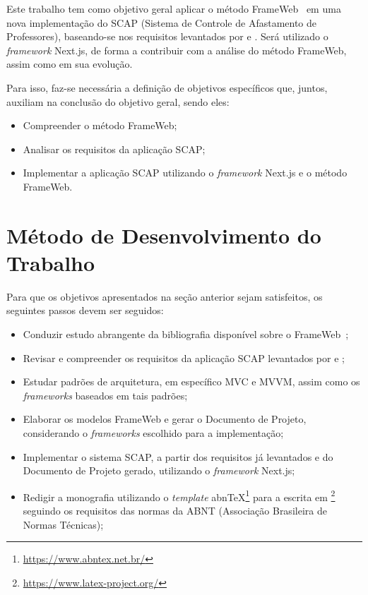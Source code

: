Este trabalho tem como objetivo geral aplicar o método FrameWeb~\cite{souza:2007} em uma nova implementação do SCAP (Sistema de Controle de Afastamento de Professores),
baseando-se nos requisitos levantados por \cite{duarte:2014} e \cite{prado:2015}. Será utilizado o \textit{framework} Next.js, de forma a contribuir com a análise do método FrameWeb, assim como em sua evolução.

Para isso, faz-se necessária a definição de objetivos específicos que, juntos, auxiliam na conclusão do objetivo geral, sendo eles:
\begin{itemize}
    \item Compreender o método FrameWeb;
    \item Analisar os requisitos da aplicação SCAP;
    \item Implementar a aplicação SCAP utilizando o \textit{framework} Next.js e o método FrameWeb.
\end{itemize}


\section{Método de Desenvolvimento do Trabalho}
\label{sec-intro-met}

Para que os objetivos apresentados na seção anterior sejam satisfeitos, os seguintes passos devem ser seguidos:

\begin{itemize}
    \item Conduzir estudo abrangente da bibliografia disponível sobre o FrameWeb~\cite{souza:2007,souza:2020};
    \item Revisar e compreender os requisitos da aplicação SCAP levantados por \cite{duarte:2014} e \cite{prado:2015};
    \item Estudar padrões de arquitetura, em específico MVC e MVVM, assim como os \textit{frameworks} baseados em tais padrões;
    \item Elaborar os modelos FrameWeb e gerar o Documento de Projeto, considerando o \textit{frameworks} escolhido para a implementação;
    \item Implementar o sistema SCAP, a partir dos requisitos já levantados e do Documento de Projeto gerado, utilizando o \textit{framework} Next.js;
    \item Redigir a monografia utilizando o \textit{template} abnTeX\footnote{\url{https://www.abntex.net.br/}} para a escrita em \latex\footnote{\url{https://www.latex-project.org/}} seguindo os requisitos das normas da ABNT (Associação Brasileira de Normas Técnicas);
\end{itemize}


